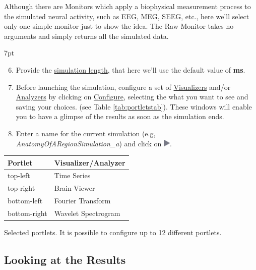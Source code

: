 \documentclass{tufte-handout}
\newenvironment{simulation}{%
  \def\FrameCommand{%
    \hspace{1pt}%
    {\color{ForestGreen}\vrule width 2pt}%
    {\color{simulationshade}\vrule width 4pt}%
    \colorbox{simulationshade}%
  }%
  \MakeFramed{\advance\hsize-\width\FrameRestore}%
  \noindent\hspace{-4.55pt}%
  \begin{adjustwidth}{}{7pt}%
  \vspace{2pt}\vspace{2pt}%
}
{%
  \vspace{2pt}\end{adjustwidth}\endMakeFramed%
}
\begin{document}
Although there are Monitors which apply a biophysical measurement process to
the simulated neural activity, such as EEG, MEG, SEEG, etc.,  here we'll select only
one simple monitor just to show the idea. The Raw Monitor takes no arguments
and simply returns all the simulated data. 


\begin{simulation}
\begin{enumerate}[resume]
  \setcounter{enumi}{5}
 \item Provide the \underline{simulation length}, that here we'll use the default value of \textbf{\unit[1000]{ms}}.
 \item Before launching the simulation, configure a set of \underline{Visualizers} and/or \underline{Analyzers} by clicking on \underline{Configure}, selecting the what you want to see and saving your choices. (see Table \ref{tab:portletstab}). These windows will enable you to have a glimpse of the results as soon as the simulation ends. 
 \item Enter a name for the current simulation (e.g, \textit{AnatomyOfARegionSimulation\_a}) and click on  \includegraphics[width=0.025\textwidth]{butt_launch_project.png}.
\end{enumerate}
\end{simulation}

\begin{margintable}
  \centering
  \selectfont
  \begin{tabular}{ll}
    \toprule
    Portlet & Visualizer/Analyzer \\
    \midrule
             top-left          &   Time Series   \\
             top-right        &   Brain Viewer\\
             bottom-left    &   Fourier Transform        \\
             bottom-right  &   Wavelet Spectrogram \\
    \bottomrule
  \end{tabular}
  \caption{Selected portlets. It is possible to configure up to 12 different portlets. }
  \label{tab:portletstab}
\end{margintable}


\subsection{Looking at the Results}\label{sec:results}
\end{document}
